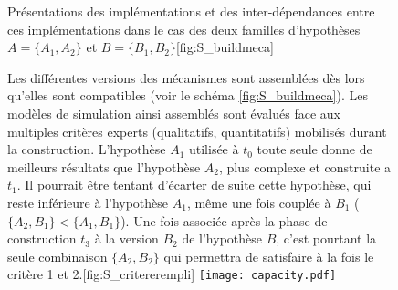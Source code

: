 \begin{figure}[p]
	\begin{sidecaption}{Présentations des implémentations et des inter-dépendances entre ces implémentations dans le cas des deux familles d'hypothèses $A = \{A_1,A_2\}$ et $B = \{B_1, B_2\}$}[fig:S_buildmeca]
	 \centering
	 \qquad
	\end{sidecaption}
\end{figure}


\begin{figure}[htbp]
\begin{sidecaption}{Les différentes versions des mécanismes sont assemblées dès lors qu'elles sont compatibles (voir le schéma \ref{fig:S_buildmeca}). Les modèles de simulation ainsi assemblés sont évalués face aux multiples critères experts (qualitatifs, quantitatifs) mobilisés durant la construction. L'hypothèse $A_1$ utilisée à $t_0$ toute seule donne de meilleurs résultats que l'hypothèse $A_2$, plus complexe et construite a $t_1$. Il pourrait être tentant d'écarter de suite cette hypothèse, qui reste inférieure à l'hypothèse $A_1$, même une fois couplée à $B_1$ ($\{A_2,B_1\} < \{A_1,B_1\}$). Une fois associée après la phase de construction $t_3$ à la version $B_2$ de l'hypothèse $B$, c'est pourtant la seule combinaison $\{A_2,B_2\}$ qui permettra de satisfaire à la fois le critère 1 et 2.}[fig:S_critererempli]
  \centering
 \texttt{[image: capacity.pdf]}
  \end{sidecaption}
\end{figure}

